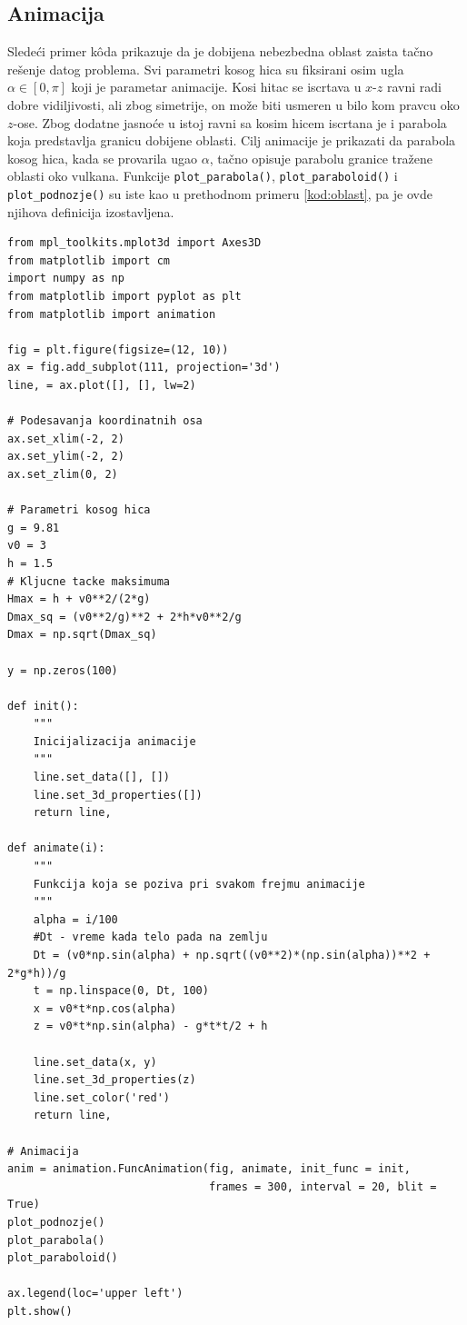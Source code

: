 \documentclass[a4paper]{article}
\begin{document}
\subsection{Animacija}
\label{kod:animacija}
Sledeći primer k\^{o}da prikazuje da je dobijena nebezbedna oblast zaista tačno rešenje
datog problema. Svi parametri kosog hica su fiksirani osim ugla $\alpha \in [0,\pi]$ 
koji je parametar animacije. Kosi hitac se iscrtava u $x$-$z$ ravni radi dobre 
vidiljivosti, ali zbog simetrije, on može biti usmeren u bilo kom pravcu oko $z$-ose.
Zbog dodatne jasnoće u istoj ravni sa kosim hicem iscrtana je i parabola koja
predstavlja granicu dobijene oblasti. Cilj animacije je prikazati da parabola kosog hica,
kada se provarila ugao $\alpha$, tačno opisuje parabolu granice 
tražene oblasti oko vulkana. Funkcije {\texttt{plot_parabola()}},
{\texttt{plot_paraboloid()}} i {\texttt{plot_podnozje()}}
su iste kao u prethodnom primeru \ref{kod:oblast}, 
pa je ovde njihova definicija izostavljena.

\begin{verbatim}
from mpl_toolkits.mplot3d import Axes3D
from matplotlib import cm
import numpy as np
from matplotlib import pyplot as plt
from matplotlib import animation

fig = plt.figure(figsize=(12, 10))
ax = fig.add_subplot(111, projection='3d')
line, = ax.plot([], [], lw=2)

# Podesavanja koordinatnih osa
ax.set_xlim(-2, 2)
ax.set_ylim(-2, 2)
ax.set_zlim(0, 2)

# Parametri kosog hica
g = 9.81
v0 = 3
h = 1.5
# Kljucne tacke maksimuma
Hmax = h + v0**2/(2*g)
Dmax_sq = (v0**2/g)**2 + 2*h*v0**2/g
Dmax = np.sqrt(Dmax_sq)

y = np.zeros(100)

def init():
    """
    Inicijalizacija animacije
    """
    line.set_data([], [])
    line.set_3d_properties([])
    return line,

def animate(i):
    """
    Funkcija koja se poziva pri svakom frejmu animacije
    """
    alpha = i/100
    #Dt - vreme kada telo pada na zemlju
    Dt = (v0*np.sin(alpha) + np.sqrt((v0**2)*(np.sin(alpha))**2 + 2*g*h))/g
    t = np.linspace(0, Dt, 100)
    x = v0*t*np.cos(alpha)
    z = v0*t*np.sin(alpha) - g*t*t/2 + h

    line.set_data(x, y)
    line.set_3d_properties(z)
    line.set_color('red')
    return line,

# Animacija
anim = animation.FuncAnimation(fig, animate, init_func = init,
                               frames = 300, interval = 20, blit = True)
plot_podnozje()
plot_parabola()
plot_paraboloid()

ax.legend(loc='upper left')
plt.show()
\end{verbatim}
\end{document}
